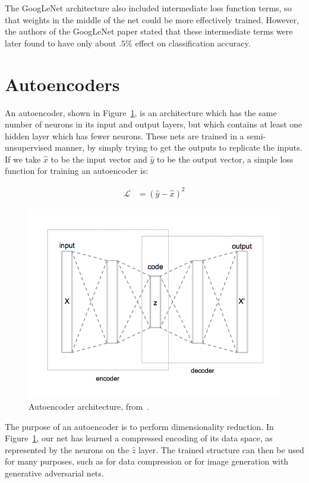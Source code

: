 The GoogLeNet architecture also included intermediate loss function terms, so that weights in the middle of the net could be more effectively trained. However, the authors of the GoogLeNet paper stated that these intermediate terms were later found to have only about $.5\%$ effect on classification accuracy.

\section{Autoencoders}

An autoencoder, shown in Figure~\ref{fig:autoencoder}, is an architecture which has the same number of neurons in its input and output layers, but which contains at least one hidden layer which has fewer neurons. These nets are trained in a semi-unsupervised manner, by simply trying to get the outputs to replicate the inputs. If we take $\hat{x}$ to be the input vector and $\hat{y}$ to be the output vector, a simple loss function for training an autoencoder is:

\begin{align}
    \mathcal{L} &= (\hat{y}-\hat{x})^2
\end{align}

\begin{figure}[htbp]
    \centering
    \includegraphics[width=\linewidth]{Images/ML/autoencoder.png}
    \caption{Autoencoder architecture, from~\cite{autoencoderDiagram}.}
    \label{fig:autoencoder}
\end{figure}

The purpose of an autoencoder is to perform dimensionality reduction. In Figure~\ref{fig:autoencoder}, our net has learned a compressed encoding of its data space, as represented by the neurons on the $\hat{z}$ layer. The trained structure can then be used for many purposes, such as for data compression or for image generation with generative adversarial nets.

